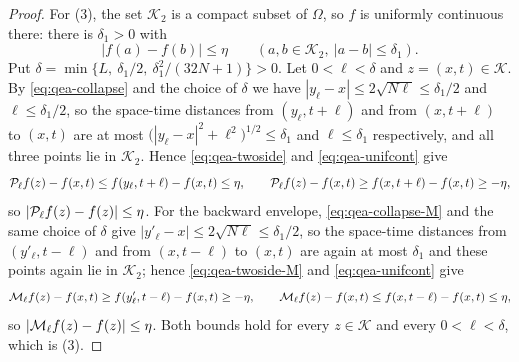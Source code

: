 \begin{proof}
For (3), the set $\mathcal K_2$ is a compact subset of $\Omega$, so $f$ is
uniformly continuous there: there is $\delta_1>0$ with
\begin{equation}\label{eq:qea-unifcont}
  |f(a)-f(b)|\le\eta\qquad(a,b\in\mathcal K_2,\ |a-b|\le\delta_1).
\end{equation}
Put $\delta=\min\bigl\{L,\ \delta_1/2,\ \delta_1^2/(32N+1)\bigr\}>0$. Let
$0<\ell<\delta$ and $z=(x,t)\in\mathcal K$. By \eqref{eq:qea-collapse} and the
choice of $\delta$ we have $|y_\ell-x|\le2\sqrt{N\ell}\le\delta_1/2$ and
$\ell\le\delta_1/2$, so the space-time distances from $(y_\ell,t+\ell)$ and from
$(x,t+\ell)$ to $(x,t)$ are at most
$\bigl(|y_\ell-x|^2+\ell^2\bigr)^{1/2}\le\delta_1$ and $\ell\le\delta_1$
respectively, and all three points lie in $\mathcal K_2$. Hence
\eqref{eq:qea-twoside} and \eqref{eq:qea-unifcont} give
\[
  \mathcal{P}_\ell f(z)-f(x,t)\le f(y_\ell,t+\ell)-f(x,t)\le\eta,
  \qquad
  \mathcal{P}_\ell f(z)-f(x,t)\ge f(x,t+\ell)-f(x,t)\ge-\eta,
\]
so $|\mathcal{P}_\ell f(z)-f(z)|\le\eta$. For the backward envelope,
\eqref{eq:qea-collapse-M} and the same choice of $\delta$ give
$|y'_\ell-x|\le2\sqrt{N\ell}\le\delta_1/2$, so the space-time distances from
$(y'_\ell,t-\ell)$ and from $(x,t-\ell)$ to $(x,t)$ are again at most $\delta_1$
and these points again lie in $\mathcal K_2$; hence \eqref{eq:qea-twoside-M} and
\eqref{eq:qea-unifcont} give
\[
  \mathcal{M}_\ell f(z)-f(x,t)\ge f(y'_\ell,t-\ell)-f(x,t)\ge-\eta,
  \qquad
  \mathcal{M}_\ell f(z)-f(x,t)\le f(x,t-\ell)-f(x,t)\le\eta,
\]
so $|\mathcal{M}_\ell f(z)-f(z)|\le\eta$. Both bounds hold for every
$z\in\mathcal K$ and every $0<\ell<\delta$, which is (3).
\end{proof}
